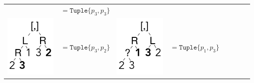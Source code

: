 \documentclass[a4paper,english]{lipics-v2019}
\newcommand{\xt}[1]{\texttt{#1}}
\newcommand{\tuple}[1]{\xt{Tuple\{}#1\xt{\}}}
\begin{document}
{\begin{tabular}{@{}l@{~}ll@{~}ll@{~}ll@{~}l}
\begin{minipage}{1.2cm}
\end{minipage} &  $ =   \tuple{p_3,p_3} $ \\
\begin{minipage}{1.2cm}\includegraphics[scale=.25]{figures/tree5.pdf} 
\end{minipage} &  $ =   \tuple{p_3,p_2} $  &
\begin{minipage}{1.2cm}\includegraphics[scale=.25]{figures/tree6.pdf} 
\end{minipage} &  $ =   \tuple{p_1,p_3} $ 

\end{tabular}}
\end{document}
